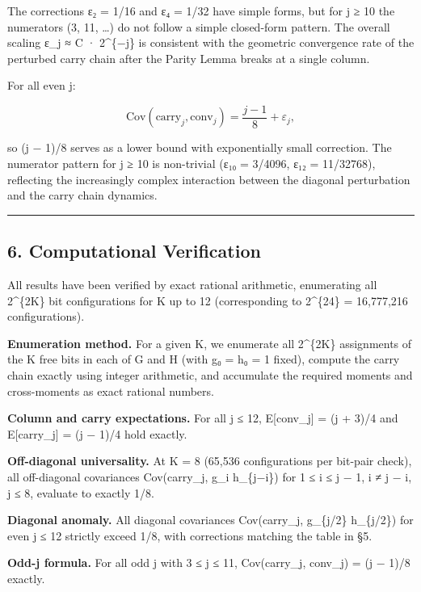 \documentclass[
  11pt,
]{article}
\begin{document}
The corrections ε₂ = 1/16 and ε₄ = 1/32 have simple forms, but for j ≥ 10 the
numerators (3, 11, \ldots) do not follow a simple closed-form pattern. The
overall scaling ε\_j ≈ C · 2\^{}\{−j\} is consistent with the geometric
convergence rate of the perturbed carry chain after the Parity Lemma breaks at a
single column.

For all even j:

\[\text{Cov}(\text{carry}_j, \text{conv}_j) = \frac{j-1}{8} + \varepsilon_j,\]

so (j − 1)/8 serves as a lower bound with exponentially small correction. The
numerator pattern for j ≥ 10 is non-trivial (ε₁₀ = 3/4096, ε₁₂ = 11/32768),
reflecting the increasingly complex interaction between the diagonal
perturbation and the carry chain dynamics.

\begin{center}\rule{0.5\linewidth}{0.5pt}\end{center}

\newpage

\subsection{6. Computational Verification}\label{computational-verification}

All results have been verified by exact rational arithmetic, enumerating all
2\^{}\{2K\} bit configurations for K up to 12 (corresponding to 2\^{}\{24\} =
16,777,216 configurations).

\textbf{Enumeration method.} For a given K, we enumerate all 2\^{}\{2K\}
assignments of the K free bits in each of G and H (with g₀ = h₀ = 1 fixed),
compute the carry chain exactly using integer arithmetic, and accumulate the
required moments and cross-moments as exact rational numbers.

\textbf{Column and carry expectations.} For all j ≤ 12, E{[}conv\_j{]} = (j +
3)/4 and E{[}carry\_j{]} = (j − 1)/4 hold exactly.

\textbf{Off-diagonal universality.} At K = 8 (65,536 configurations per bit-pair
check), all off-diagonal covariances Cov(carry\_j, g\_i h\_\{j−i\}) for 1 ≤ i ≤
j − 1, i ≠ j − i, j ≤ 8, evaluate to exactly 1/8.

\textbf{Diagonal anomaly.} All diagonal covariances Cov(carry\_j, g\_\{j/2\}
h\_\{j/2\}) for even j ≤ 12 strictly exceed 1/8, with corrections matching the
table in §5.

\textbf{Odd-j formula.} For all odd j with 3 ≤ j ≤ 11, Cov(carry\_j, conv\_j) =
(j − 1)/8 exactly.
\end{document}
